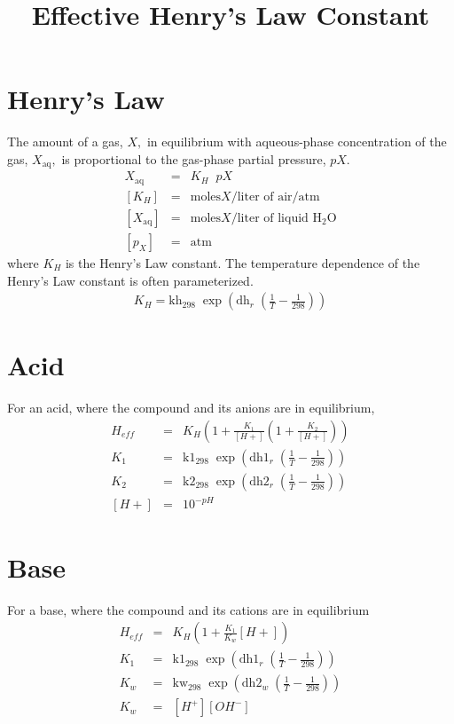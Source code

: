 \documentclass[11pt, oneside]{article}   	%
\title{Effective Henry's Law Constant}
\date{}							%
\begin{document}
\maketitle
\section*{Henry's Law}
The amount of a gas, $X,$ in equilibrium with aqueous-phase concentration of the gas, $X_{\mbox{aq}},$ is proportional to the gas-phase partial pressure, $pX$.
\begin{eqnarray*}
X_{\mbox{aq}} &=& K_H \;\; pX \\
\left[K_H\right] &=& \mbox{moles} X / \mbox{liter of air} / \mbox{atm} \\
\left[X_{\mbox{aq}}\right] &=& \mbox{moles} X / \mbox{liter of liquid } \mbox{H}_2\mbox{O} \\
\left[p_X\right] &=& \mbox{atm}
\end{eqnarray*}
where $K_H$ is the Henry's Law constant.
The temperature dependence of the Henry's Law constant is often parameterized.
\begin{eqnarray*}
K_H = \mbox{kh}_{298} \; \exp\left(\mbox{dh}_r \;\left(\frac{1}{T}-\frac{1}{298}\right)\right) 
\end{eqnarray*}

\section*{Acid}
For an acid, where the compound and its anions are in equilibrium,
\begin{eqnarray*}
H_{eff} &=& K_H \left(1 + \frac{K_1}{[H+]}\left(1 + \frac{K_2}{ [H+]}\right)\right) \\
K_1&=&\mbox{k1}_{298} \; \exp(\mbox{dh1}_r \;(\frac{1}{T}-\frac{1}{298})) \\ 
K_2&=&\mbox{k2}_{298} \; \exp(\mbox{dh2}_r \;(\frac{1}{T}-\frac{1}{298})) \\ 
{[H+]} &=& 10^{-pH}
\end{eqnarray*}


\section*{Base}
For a base, where the compound and its cations are in equilibrium
\begin{eqnarray*}
H_{eff} &=& K_H \left(1 + \frac{K_1}{K_w}{[H+]}\right) \\
K_1&=&\mbox{k1}_{298} \; \exp(\mbox{dh1}_r \;(\frac{1}{T}-\frac{1}{298})) \\ 
K_w&=&\mbox{kw}_{298} \; \exp(\mbox{dh2}_w \;(\frac{1}{T}-\frac{1}{298})) \\ 
K_w &=& \left[ H^+ \right] \left[ OH^-\right]
\end{eqnarray*}
\end{document}
